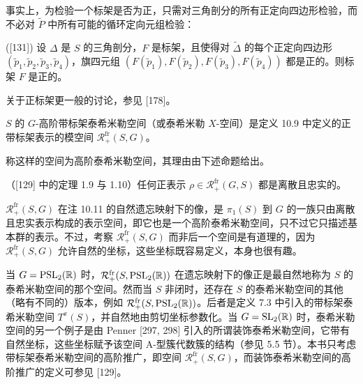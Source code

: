 事实上，为检验一个标架是否为正，只需对三角剖分的所有正定向四边形检验，而不必对 $\tilde P$ 中所有可能的循环定向元组检验：

\begin{proposition}[10.12] ([131]) 设 $\Delta$ 是 $S$ 的三角剖分，$F$ 是标架，且使得对 $\tilde\Delta$ 的每个正定向四边形 $(\tilde p_1,\tilde p_2,\tilde p_3,\tilde p_4)$，旗四元组 $(F(\tilde p_1),F(\tilde p_2),F(\tilde p_3),F(\tilde p_4))$ 都是正的。则标架 $F$ 是正的。
\end{proposition}

\begin{remark}[10.13] 关于正标架更一般的讨论，参见 [178]。
\end{remark}

\begin{definition}[10.14] $S$ 的 $G$-高阶带标架泰希米勒空间（或泰希米勒 $X$-空间）是定义 10.9 中定义的正带标架表示的模空间 $\mathcal{R}^{\mathrm{fr}}_+(S,G)$。
\end{definition}

称这样的空间为高阶泰希米勒空间，其理由由下述命题给出。

\begin{proposition}[10.15]（[129] 中的定理 1.9 与 1.10）任何正表示 $\rho\in\mathcal{R}^{\mathrm{fr}}_+(G,S)$ 都是离散且忠实的。
\end{proposition}

$\mathcal{R}^{\mathrm{fr}}_+(S,G)$ 在注 10.11 的自然遗忘映射下的像，是 $\pi_1(S)$ 到 $G$ 的一族只由离散且忠实表示构成的表示空间，即它也是一个高阶泰希米勒空间，只不过它只描述基本群的表示。不过，考察 $\mathcal{R}^{\mathrm{fr}}_+(S,G)$ 而非后一个空间是有道理的，因为 $\mathcal{R}^{\mathrm{fr}}_+(S,G)$ 允许自然的坐标，这些坐标既容易定义，本身也很有趣。

\begin{remark}[10.16] 当 $G=\operatorname{PSL}_2(\mathbb{R})$ 时，$\mathcal{R}^{\mathrm{fr}}_+(S,\operatorname{PSL}_2(\mathbb{R}))$ 在遗忘映射下的像正是最自然地称为 $S$ 的泰希米勒空间的那个空间。然而当 $S$ 非闭时，还存在 $S$ 的泰希米勒空间的其他（略有不同的）版本，例如 $\mathcal{R}^{\mathrm{fr}}_+(S,\operatorname{PSL}_2(\mathbb{R}))$。后者是定义 7.3 中引入的带标架泰希米勒空间 $T^x(S)$，并自然地由剪切坐标参数化。当 $G=\operatorname{SL}_2(\mathbb{R})$ 时，泰希米勒空间的另一个例子是由 Penner [297, 298] 引入的所谓装饰泰希米勒空间，它带有自然坐标，这些坐标赋予该空间 A-型簇代数簇的结构（参见 5.5 节）。本书只考虑带标架泰希米勒空间的高阶推广，即空间 $\mathcal{R}^{\mathrm{fr}}_+(S,G)$，而装饰泰希米勒空间的高阶推广的定义可参见 [129]。
\end{remark}

